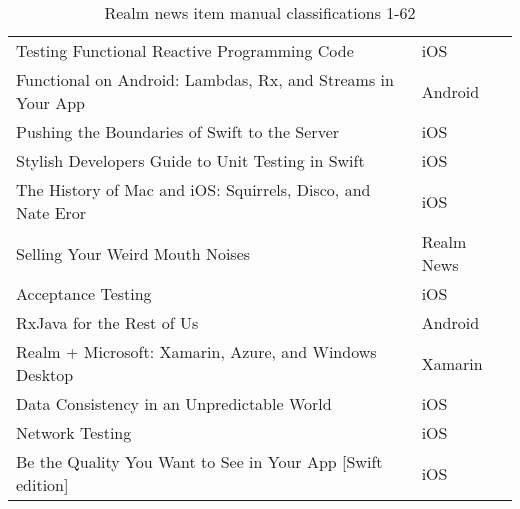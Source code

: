 \documentclass[letterpaper,11pt]{article}
\begin{document}
\begin{table}[h]
\begin{adjustbox}{max width=\linewidth}
\begin{tabular}{ | l | l |}
Testing Functional Reactive Programming Code & iOS \\ 
Functional on Android: Lambdas, Rx, and Streams in Your App & Android \\ 
Pushing the Boundaries of Swift to the Server & iOS \\ 
Stylish Developers Guide to Unit Testing in Swift & iOS \\ 
The History of Mac and iOS: Squirrels, Disco, and Nate Eror & iOS \\ 
Selling Your Weird Mouth Noises & Realm News \\ 
Acceptance Testing & iOS \\ 
RxJava for the Rest of Us & Android \\ 
Realm + Microsoft: Xamarin, Azure, and Windows Desktop & Xamarin \\ 
Data Consistency in an Unpredictable World & iOS \\ 
Network Testing & iOS \\ 
Be the Quality You Want to See in Your App [Swift edition] & iOS \\ 
\hline
\end{tabular}
\end{adjustbox}
\caption{Realm news item manual classifications 1-62}
\label{table:q1mclass1}
\end{table}
\end{document}
